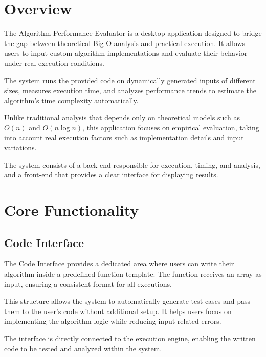 \documentclass[12pt]{article}
\begin{document}

\section{Overview}


The Algorithm Performance Evaluator is a desktop application designed to bridge the gap between theoretical Big O analysis and practical execution. It allows users to input custom algorithm implementations and evaluate their behavior under real execution conditions.

The system runs the provided code on dynamically generated inputs of different sizes, measures execution time, and analyzes performance trends to estimate the algorithm's time complexity automatically.

Unlike traditional analysis that depends only on theoretical models such as $O(n)$ and $O(n \log n)$, this application focuses on empirical evaluation, taking into account real execution factors such as implementation details and input variations.

The system consists of a back-end responsible for execution, timing, and analysis, and a front-end that provides a clear interface for displaying results.

\section{Core Functionality}


\subsection{Code Interface}

The Code Interface provides a dedicated area where users can write their algorithm inside a predefined function template. The function receives an array as input, ensuring a consistent format for all executions.

This structure allows the system to automatically generate test cases and pass them to the user’s code without additional setup. It helps users focus on implementing the algorithm logic while reducing input-related errors.

The interface is directly connected to the execution engine, enabling the written code to be tested and analyzed within the system.
\end{document}
